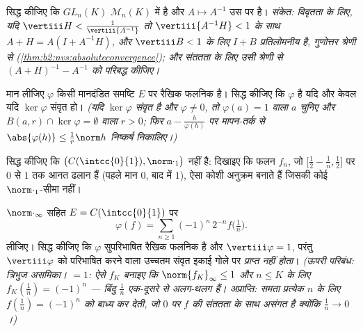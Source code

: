 \begin{exercise}[$\star\star$]\label{exo:b2:nvs:5}
सिद्ध कीजिए कि $GL_n(K)$ $\mathcal{M}_n(K)$ में  है और $A
\mapsto A^{-1}$ उस पर  है।
\emph{संकेत: विवृतता के लिए, यदि $\vertiii H < \frac{1}{\vertiii{A^{-1}}}$ तो $\vertiii{A^{-1}H} < 1$ के साथ $A + H = A(I +
A^{-1}H)$, और $\vertiii B < 1$ के लिए
$I + B$ प्रतिलोमनीय है, गुणोत्तर श्रेणी से (\cref{thm:b2:nvs:absoluteconvergence}); और संततता के लिए उसी
श्रेणी से $(A+H)^{-1} - A^{-1}$ को परिबद्ध कीजिए।}
\end{exercise}

\begin{exercise}[$\star\star$]\label{exo:b2:nvs:6}
मान लीजिए $\varphi$ किसी मानदंडित समष्टि $E$ पर रैखिक फलनिक है। सिद्ध कीजिए
कि $\varphi$  है यदि और केवल यदि $\ker\varphi$ संवृत हो। \emph{(यदि $\ker\varphi$ संवृत है और
$\varphi \neq 0$, तो $\varphi(a) = 1$ वाला $a$ चुनिए और $B(a, r) \cap \ker\varphi =
\emptyset$ वाला $r > 0$; फिर $a - \frac{h}{\varphi(h)}$ पर मापन-तर्क से
$\abs{\varphi(h)} \leq \frac{1}{r}\norm h$ निष्कर्ष निकालिए।)}
\end{exercise}

\begin{exercise}[$\star\star$]\label{exo:b2:nvs:7}
सिद्ध कीजिए कि $\bigl(C(\intcc{0}{1}), \norm\cdot_1\bigr)$  नहीं है: दिखाइए कि फलन $f_n$, जो $\bigl[\frac12 - \frac1n, \frac12\bigr]$ पर $0$ से
$1$ तक आनत ढलान हैं (पहले मान $0$, बाद में $1$), ऐसा कोशी अनुक्रम बनाते
हैं जिसकी कोई  $\norm\cdot_1$-सीमा नहीं।
\end{exercise}

\begin{exercise}[$\star\star\star$]\label{exo:b2:nvs:8}
$\norm\cdot_\infty$ सहित $E = C(\intcc{0}{1})$ पर
\[
\varphi(f) = \sum_{n \geq 1} (-1)^n\, 2^{-n} f\bigl(\tfrac1n\bigr).
\]
लीजिए। सिद्ध कीजिए कि $\varphi$ सुपरिभाषित  रैखिक फलनिक है और $\vertiii\varphi = 1$, परंतु
$\vertiii\varphi$ को परिभाषित करने वाला उच्चतम संवृत इकाई गोले पर \emph{प्राप्त नहीं
होता}। \emph{(ऊपरी परिबंध: त्रिभुज असमिका।  $= 1$: ऐसे  $f_K$
बनाइए कि $\norm{f_K}_\infty \leq 1$ और $n \leq K$ के लिए $f_K(\frac1n)
= (-1)^n$ --- बिंदु $\frac1n$ एक-दूसरे से अलग-थलग
हैं। अप्राप्ति: समता प्रत्येक $n$ के लिए $f(\frac1n) =
(-1)^n$ को बाध्य कर देती, जो $0$
पर $f$ की संततता के साथ असंगत है क्योंकि $\frac1n \to 0$।)}
\end{exercise}

